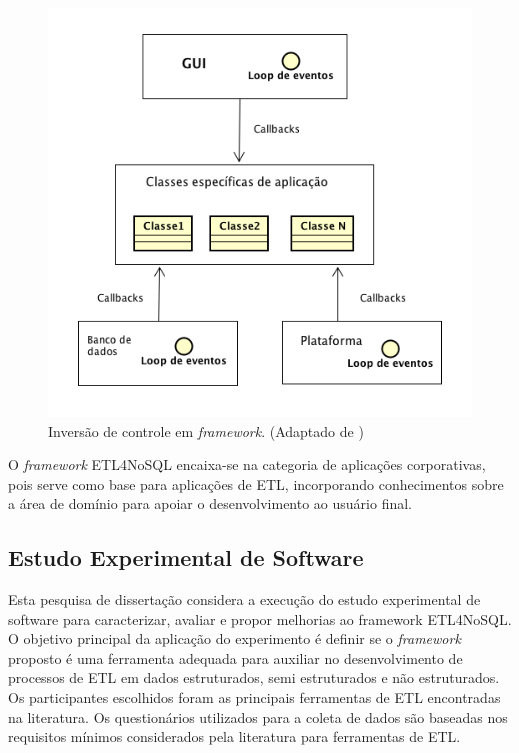 \begin{figure}[h!]
	\centering
	\includegraphics[scale=0.6]{fig/inversaodecontrole.png}
	\caption{Inversão de controle em \textit{framework}. (Adaptado de \cite{sommerville:2013})}
	\label{inversaodecontrole}
\end{figure}

O \textit{framework} ETL4NoSQL encaixa-se na categoria de aplicações corporativas, pois serve como base para aplicações de ETL, incorporando conhecimentos sobre a área de domínio para apoiar o desenvolvimento ao usuário final.




\subsection{Estudo Experimental de Software}

Esta pesquisa de dissertação considera a execução do estudo experimental de software para caracterizar, avaliar e propor melhorias ao framework ETL4NoSQL. O objetivo principal da aplicação do experimento é definir se o \textit{framework} proposto é uma ferramenta adequada para auxiliar no desenvolvimento de processos de ETL em dados estruturados, semi estruturados e não estruturados. Os participantes escolhidos foram as principais ferramentas de ETL encontradas na literatura. Os questionários utilizados para a coleta de dados são baseadas nos requisitos mínimos considerados pela literatura para ferramentas de ETL.

